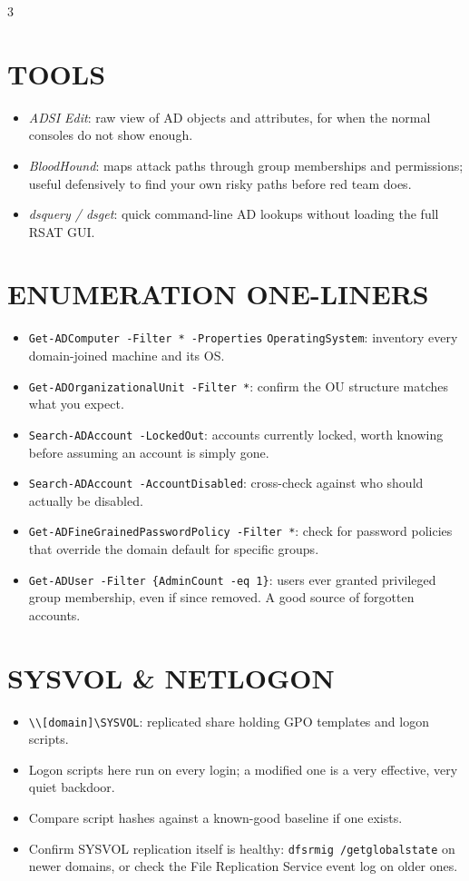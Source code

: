 \documentclass[7pt,landscape]{article}
\begin{document}
\begin{multicols*}{3}
\section{TOOLS}
\begin{itemize}
    \item \textit{ADSI Edit}: raw view of AD objects and attributes, for when the normal consoles do not show enough.
    \item \textit{BloodHound}: maps attack paths through group memberships and permissions; useful defensively to find your own risky paths before red team does.
    \item \textit{dsquery / dsget}: quick command-line AD lookups without loading the full RSAT GUI.
\end{itemize}

\section{ENUMERATION ONE-LINERS}
\begin{itemize}
    \item \texttt{Get-ADComputer -Filter * -Properties} \newline \texttt{OperatingSystem}: inventory every domain-joined machine and its OS.
    \item \texttt{Get-ADOrganizationalUnit -Filter *}: confirm the OU structure matches what you expect.
    \item \texttt{Search-ADAccount -LockedOut}: accounts currently locked, worth knowing before assuming an account is simply gone.
    \item \texttt{Search-ADAccount -AccountDisabled}: cross-check against who should actually be disabled.
    \item \texttt{Get-ADFineGrainedPasswordPolicy -Filter *}: check for password policies that override the domain default for specific groups.
    \item \texttt{Get-ADUser -Filter \{AdminCount -eq 1\}}: users ever granted privileged group membership, even if since removed. A good source of forgotten accounts.
\end{itemize}

\section{SYSVOL \& NETLOGON}
\begin{itemize}
    \item \texttt{\textbackslash\textbackslash [domain]\textbackslash SYSVOL}: replicated share holding GPO templates and logon scripts.
    \item Logon scripts here run on every login; a modified one is a very effective, very quiet backdoor.
    \item Compare script hashes against a known-good baseline if one exists.
    \item Confirm SYSVOL replication itself is healthy: \texttt{dfsrmig /getglobalstate} on newer domains, or check the File Replication Service event log on older ones.
\end{itemize}


\end{multicols*}
\end{document}

